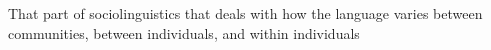 That part of sociolinguistics that deals with how the language varies between communities, between individuals, and within individuals
